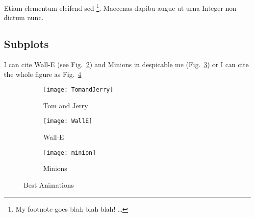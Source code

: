 Etiam elementum eleifend sed \footnote{My footnote goes blah blah blah! \dots}. Maecenas dapibu augue ut urna Integer non dictum nunc.


\begin{landscape}

\section*{Subplots}
I can cite Wall-E (see Fig.~\ref{fig:WallE}) and Minions in despicable me (Fig.~\ref{fig:Minnion}) or I can cite the whole figure as Fig.~\ref{fig:animations}

\begin{figure}
  \centering
  \begin{subfigure}[b]{0.3\textwidth}
    \texttt{[image: TomandJerry]}
    \caption{Tom and Jerry}
    \label{fig:TomJerry}   
  \end{subfigure}             
  \begin{subfigure}[b]{0.3\textwidth}
    \texttt{[image: WallE]}
    \caption{Wall-E}
    \label{fig:WallE}
  \end{subfigure}             
  \begin{subfigure}[b]{0.3\textwidth}
    \texttt{[image: minion]}
    \caption{Minions}
    \label{fig:Minnion}
  \end{subfigure}
  \caption{Best Animations}
  \label{fig:animations}
\end{figure}


\end{landscape}
